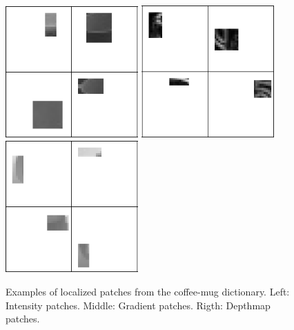 \documentclass[letterpaper, 10 pt, conference]{ieeeconf}  %
\begin{document}
\begin{figure}[thb]
\begin{center}
  \includegraphics[width=2in]{intensity_patches.png} \quad
  \includegraphics[width=2in]{gradient_patches.png} \quad 
  \includegraphics[width=2in]{depth_patches.png}
\end{center}
\caption{Examples of localized patches from the coffee-mug dictionary. Left: Intensity patches. Middle: Gradient patches. Rigth: Depthmap patches.}
\label{fig:mug_classifier}
\end{figure}
\end{document}
